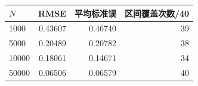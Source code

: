 \begin{tabular}{lrrr}
\toprule
$N$ & RMSE & 平均标准误 & 区间覆盖次数/40 \\
\midrule
1000 & 0.43607 & 0.46740 & 39 \\
5000 & 0.20489 & 0.20782 & 38 \\
10000 & 0.18061 & 0.14671 & 34 \\
50000 & 0.06506 & 0.06579 & 40 \\
\bottomrule
\end{tabular}
